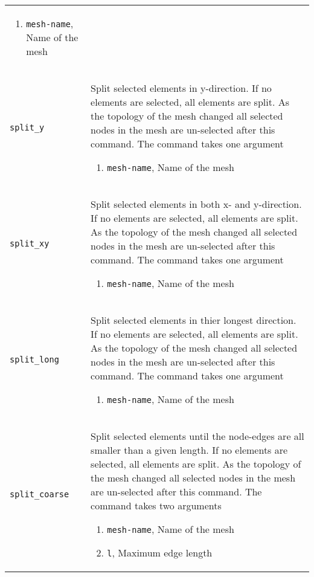 \documentclass[noshowpacs,preprintnumbers,amsmath,amssymb, letter]{revtex4}
\begin{document}
\begin{longtable}{p{}p{}}
\begin{enumerate}
\item \texttt{mesh-name}, Name of the mesh
\end{enumerate}\\
\texttt{split\_y}	& Split selected elements in y-direction. If no elements are selected, all elements are split. As the topology of the mesh changed all selected nodes in the mesh are un-selected after this command. The command takes one argument 
\begin{enumerate}
\item \texttt{mesh-name}, Name of the mesh
\end{enumerate}\\
\texttt{split\_xy}	& Split selected elements in both x- and y-direction. If no elements are selected, all elements are split. As the topology of the mesh changed all selected nodes in the mesh are un-selected after this command. The command takes one argument 
\begin{enumerate}
\item \texttt{mesh-name}, Name of the mesh
\end{enumerate}\\
\texttt{split\_long}	& Split selected elements in thier longest direction. If no elements are selected, all elements are split. As the topology of the mesh changed all selected nodes in the mesh are un-selected after this command. The command takes one argument 
\begin{enumerate}
\item \texttt{mesh-name}, Name of the mesh
\end{enumerate}\\
\texttt{split\_coarse}	& Split selected elements until the node-edges are all smaller than a given length. If no elements are selected, all elements are split. As the topology of the mesh changed all selected nodes in the mesh are un-selected after this command. The command takes two arguments 
\begin{enumerate}
\item \texttt{mesh-name}, Name of the mesh
\item \texttt{l}, Maximum edge length
\end{enumerate}\\

\end{longtable}
\end{document}
